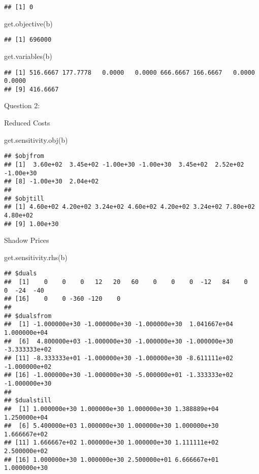 \documentclass[
]{article}
\newenvironment{Shaded}{\begin{snugshade}}{\end{snugshade}}
\newcommand{\FunctionTok}[1]{\textcolor[rgb]{0.00,0.00,0.00}{#1}}
\newcommand{\NormalTok}[1]{#1}
\begin{document}
\begin{verbatim}
## [1] 0
\end{verbatim}

\begin{Shaded}
\begin{Highlighting}[]
\FunctionTok{get.objective}\NormalTok{(b)}
\end{Highlighting}
\end{Shaded}

\begin{verbatim}
## [1] 696000
\end{verbatim}

\begin{Shaded}
\begin{Highlighting}[]
\FunctionTok{get.variables}\NormalTok{(b)}
\end{Highlighting}
\end{Shaded}

\begin{verbatim}
## [1] 516.6667 177.7778   0.0000   0.0000 666.6667 166.6667   0.0000   0.0000
## [9] 416.6667
\end{verbatim}

Question 2:

Reduced Costs

\begin{Shaded}
\begin{Highlighting}[]
\FunctionTok{get.sensitivity.obj}\NormalTok{(b)}
\end{Highlighting}
\end{Shaded}

\begin{verbatim}
## $objfrom
## [1]  3.60e+02  3.45e+02 -1.00e+30 -1.00e+30  3.45e+02  2.52e+02 -1.00e+30
## [8] -1.00e+30  2.04e+02
## 
## $objtill
## [1] 4.60e+02 4.20e+02 3.24e+02 4.60e+02 4.20e+02 3.24e+02 7.80e+02 4.80e+02
## [9] 1.00e+30
\end{verbatim}

Shadow Prices

\begin{Shaded}
\begin{Highlighting}[]
\FunctionTok{get.sensitivity.rhs}\NormalTok{(b)}
\end{Highlighting}
\end{Shaded}

\begin{verbatim}
## $duals
##  [1]    0    0    0   12   20   60    0    0    0  -12   84    0    0  -24  -40
## [16]    0    0 -360 -120    0
## 
## $dualsfrom
##  [1] -1.000000e+30 -1.000000e+30 -1.000000e+30  1.041667e+04  1.000000e+04
##  [6]  4.800000e+03 -1.000000e+30 -1.000000e+30 -1.000000e+30 -3.333333e+02
## [11] -8.333333e+01 -1.000000e+30 -1.000000e+30 -8.611111e+02 -1.000000e+02
## [16] -1.000000e+30 -1.000000e+30 -5.000000e+01 -1.333333e+02 -1.000000e+30
## 
## $dualstill
##  [1] 1.000000e+30 1.000000e+30 1.000000e+30 1.388889e+04 1.250000e+04
##  [6] 5.400000e+03 1.000000e+30 1.000000e+30 1.000000e+30 1.666667e+02
## [11] 1.666667e+02 1.000000e+30 1.000000e+30 1.111111e+02 2.500000e+02
## [16] 1.000000e+30 1.000000e+30 2.500000e+01 6.666667e+01 1.000000e+30
\end{verbatim}
\end{document}
